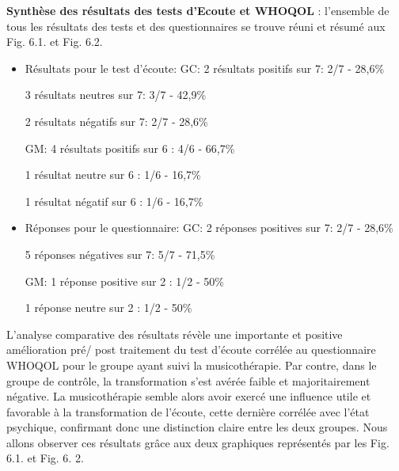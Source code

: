     \textbf{ Synthèse  des résultats  des tests d'Ecoute et WHOQOL}
     : l'ensemble de tous les résultats des tests et des questionnaires se trouve réuni et résumé
    aux Fig. 6.1. et Fig. 6.2.
   \begin{itemize}
   	 \item Résultats pour le test d'écoute: 
  GC: 2 résultats positifs sur 7:       2/7 - 28,6\%
  
  3 résultats neutres sur 7:			3/7 - 42,9\%
  		  
  		  2 résultats négatifs sur 7:		2/7 - 28,6\%
  		  
  		  GM: 4 résultats positifs sur 6    :       4/6 - 66,7\%
  
  1 résultat neutre sur 6 : 			1/6 - 16,7\%
  		  
  		  1 résultat négatif sur 6 : 		     1/6 - 16,7\%
  		  
  		    \item Réponses pour le questionnaire:    GC: 2 réponses positives sur 7:       2/7  - 28,6\%
   
   5 réponses négatives sur 7: 	5/7 - 71,5\%
   
   			 GM: 1 réponse positive sur 2    :       1/2 - 50\%
   			 
   			  1 réponse neutre sur 2 : 			1/2 - 50\%
  		  \end{itemize}
L'analyse comparative des résultats révèle une importante et positive amélioration pré/ post traitement 
du test d'écoute corrélée au questionnaire WHOQOL pour le groupe ayant suivi la musicothérapie. Par 
contre, dans  le groupe de contrôle, la 
transformation s'est avérée faible et majoritairement négative. La musicothérapie semble alors avoir 
exercé une influence utile et favorable à la transformation de l'écoute, cette dernière corrélée avec l'état 
psychique, confirmant donc une distinction claire entre les deux groupes. 
Nous allons observer ces résultats grâce aux deux graphiques représentés par  les Fig. 6.1. et Fig. 6. 2.





